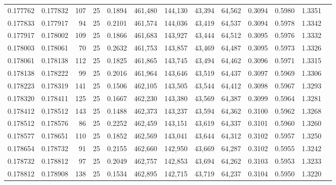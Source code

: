 \begin{tabular}{rrrrrrrrrrrrr}
0.177762 & 0.177832 &   107 &  25 &                                     0.1894 & 461,480 & 144,130 &  43,394 &  64,562 & 0.3094 & 0.5980 & 1.3351 \\
0.177833 & 0.177917 &    94 &  25 &                                     0.2101 & 461,574 & 144,036 &  43,419 &  64,537 & 0.3094 & 0.5978 & 1.3342 \\
0.177917 & 0.178002 &   109 &  25 &                                     0.1866 & 461,683 & 143,927 &  43,444 &  64,512 & 0.3095 & 0.5976 & 1.3332 \\
0.178003 & 0.178061 &    70 &  25 &                                     0.2632 & 461,753 & 143,857 &  43,469 &  64,487 & 0.3095 & 0.5973 & 1.3326 \\
0.178061 & 0.178138 &   112 &  25 &                                     0.1825 & 461,865 & 143,745 &  43,494 &  64,462 & 0.3096 & 0.5971 & 1.3315 \\
0.178138 & 0.178222 &    99 &  25 &                                     0.2016 & 461,964 & 143,646 &  43,519 &  64,437 & 0.3097 & 0.5969 & 1.3306 \\
0.178223 & 0.178319 &   141 &  25 &                                     0.1506 & 462,105 & 143,505 &  43,544 &  64,412 & 0.3098 & 0.5967 & 1.3293 \\
0.178320 & 0.178411 &   125 &  25 &                                     0.1667 & 462,230 & 143,380 &  43,569 &  64,387 & 0.3099 & 0.5964 & 1.3281 \\
0.178412 & 0.178512 &   143 &  25 &                                     0.1488 & 462,373 & 143,237 &  43,594 &  64,362 & 0.3100 & 0.5962 & 1.3268 \\
0.178512 & 0.178576 &    86 &  25 &                                     0.2252 & 462,459 & 143,151 &  43,619 &  64,337 & 0.3101 & 0.5960 & 1.3260 \\
0.178577 & 0.178651 &   110 &  25 &                                     0.1852 & 462,569 & 143,041 &  43,644 &  64,312 & 0.3102 & 0.5957 & 1.3250 \\
0.178654 & 0.178732 &    91 &  25 &                                     0.2155 & 462,660 & 142,950 &  43,669 &  64,287 & 0.3102 & 0.5955 & 1.3242 \\
0.178732 & 0.178812 &    97 &  25 &                                     0.2049 & 462,757 & 142,853 &  43,694 &  64,262 & 0.3103 & 0.5953 & 1.3233 \\
0.178812 & 0.178908 &   138 &  25 &                                     0.1534 & 462,895 & 142,715 &  43,719 &  64,237 & 0.3104 & 0.5950 & 1.3220 \\

\end{tabular}
